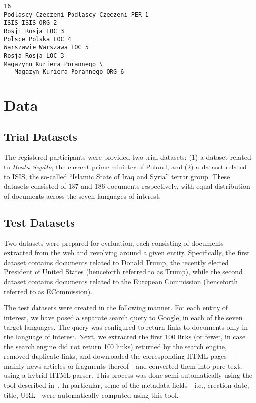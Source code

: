 \documentclass[11pt]{article}
\begin{document}
\begin{small}
\begin{verbatim}
16
Podlascy Czeczeni Podlascy Czeczeni PER 1
ISIS ISIS ORG 2
Rosji Rosja LOC 3
Polsce Polska LOC 4
Warszawie Warszawa LOC 5
Rosja Rosja LOC 3
Magazynu Kuriera Porannego \
   Magazyn Kuriera Porannego ORG 6
\end{verbatim}	    
\end{small}

\section{Data}
\label{sec:annotation}

\subsection{Trial Datasets}

The registered participants were provided two trial datasets:
(1) a dataset related to {\em Beata Szydło}, the current prime minister of Poland, and (2)
a dataset related to ISIS, the so-called ``Islamic State of Iraq and Syria'' terror group.
These datasets consisted of 187 and 186 documents respectively, with
equal distribution of documents across the seven languages of interest.

\subsection{Test Datasets}

Two datasets were prepared for evaluation, each consisting of documents
extracted from the web and revolving around a given entity.  Specifically, the
first dataset contains documents related to Donald Trump, the recently elected
President of United States (henceforth referred to as {\sc Trump}), while the
second dataset contains documents related to the European Commission
(henceforth referred to as {\sc ECommission}).

The test datasets were created in the following manner.  For each entity
of interest, we have posed a separate search query to Google, in each of
the seven target languages.  The query was configured to return links to
documents only in the language of interest.  Next, we extracted the first
100 links (or fewer, in case the search engine did not return 100
links) returned by the search engine, removed duplicate links, and
downloaded the corresponding HTML pages---mainly news articles or
fragments thereof---and converted them into pure text, using a hybrid
HTML parser.  This process was done semi-automatically using the tool
described in~\cite{Crawley:ea:2010}.  In particular, some of the metadata
fields---i.e., creation date, title, URL---were automatically computed
using this tool.
\end{document}
